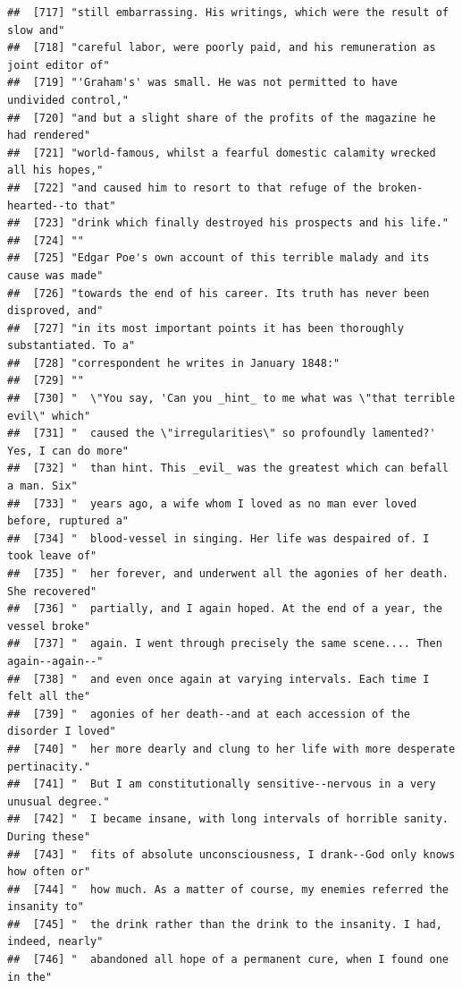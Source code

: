 \documentclass{article}\usepackage[]{graphicx}\usepackage[]{color}
\makeatletter
\newenvironment{kframe}{%
 \def\at@end@of@kframe{}%
 \ifinner\ifhmode%
  \def\at@end@of@kframe{\end{minipage}}%
  \begin{minipage}{\columnwidth}%
 \fi\fi%
 \def\FrameCommand##1{\hskip\@totalleftmargin \hskip-\fboxsep
 \colorbox{shadecolor}{##1}\hskip-\fboxsep
     \hskip-\linewidth \hskip-\@totalleftmargin \hskip\columnwidth}%
 \MakeFramed {\advance\hsize-\width
   \@totalleftmargin\z@ \linewidth\hsize
   \@setminipage}}%
 {\par\unskip\endMakeFramed%
 \at@end@of@kframe}
\newenvironment{knitrout}{}{} %
\makeatother
\begin{document}
\begin{knitrout}
\begin{kframe}
\begin{verbatim}
##  [717] "still embarrassing. His writings, which were the result of slow and"         
##  [718] "careful labor, were poorly paid, and his remuneration as joint editor of"    
##  [719] "'Graham's' was small. He was not permitted to have undivided control,"       
##  [720] "and but a slight share of the profits of the magazine he had rendered"       
##  [721] "world-famous, whilst a fearful domestic calamity wrecked all his hopes,"     
##  [722] "and caused him to resort to that refuge of the broken-hearted--to that"      
##  [723] "drink which finally destroyed his prospects and his life."                   
##  [724] ""                                                                            
##  [725] "Edgar Poe's own account of this terrible malady and its cause was made"      
##  [726] "towards the end of his career. Its truth has never been disproved, and"      
##  [727] "in its most important points it has been thoroughly substantiated. To a"     
##  [728] "correspondent he writes in January 1848:"                                    
##  [729] ""                                                                            
##  [730] "  \"You say, 'Can you _hint_ to me what was \"that terrible evil\" which"    
##  [731] "  caused the \"irregularities\" so profoundly lamented?' Yes, I can do more" 
##  [732] "  than hint. This _evil_ was the greatest which can befall a man. Six"       
##  [733] "  years ago, a wife whom I loved as no man ever loved before, ruptured a"    
##  [734] "  blood-vessel in singing. Her life was despaired of. I took leave of"       
##  [735] "  her forever, and underwent all the agonies of her death. She recovered"    
##  [736] "  partially, and I again hoped. At the end of a year, the vessel broke"      
##  [737] "  again. I went through precisely the same scene.... Then again--again--"    
##  [738] "  and even once again at varying intervals. Each time I felt all the"        
##  [739] "  agonies of her death--and at each accession of the disorder I loved"       
##  [740] "  her more dearly and clung to her life with more desperate pertinacity."    
##  [741] "  But I am constitutionally sensitive--nervous in a very unusual degree."    
##  [742] "  I became insane, with long intervals of horrible sanity. During these"     
##  [743] "  fits of absolute unconsciousness, I drank--God only knows how often or"    
##  [744] "  how much. As a matter of course, my enemies referred the insanity to"      
##  [745] "  the drink rather than the drink to the insanity. I had, indeed, nearly"    
##  [746] "  abandoned all hope of a permanent cure, when I found one in the"           

\end{verbatim}
\end{kframe}
\end{knitrout}
\end{document}
